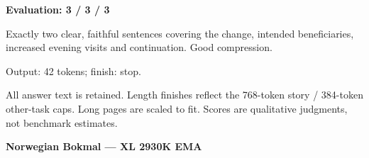 \documentclass[10pt]{article}
\begin{document}
{\begin{minipage}{\textwidth}
\textbf{Evaluation: 3 / 3 / 3}\par Exactly two clear, faithful sentences covering the change, intended beneficiaries, increased evening visits and continuation. Good compression.
\par {\color{gray} Output: 42 tokens; finish: stop.}\par
\medskip\footnotesize All answer text is retained. Length finishes reflect the 768-token story / 384-token other-task caps. Long pages are scaled to fit. Scores are qualitative judgments, not benchmark estimates.
\end{minipage}}%
\noindent\ifdim\dimexpr\ht\languagepage+\dp\languagepage\relax>0.93\textheight%
\resizebox*{!}{0.93\textheight}{\usebox{\languagepage}}%
\else\usebox{\languagepage}\fi%
\clearpage
{\Large\bfseries Norwegian Bokmal --- XL 2930K EMA}\par\smallskip
\end{document}

